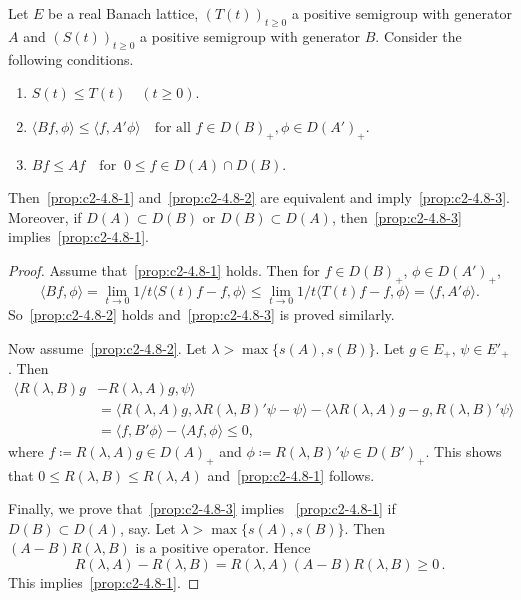 \begin{proposition}\label{prop:c2-4.8}
Let $E$ be a real Banach lattice, $(T(t))_{t \geq 0}$ a
positive semigroup with generator $A$ and $(S(t))_{t \geq 0}$ a positive
semigroup with generator $B$. Consider the following conditions.
\begin{enumerate}[\upshape (a)]
\item \label{prop:c2-4.8-1}
$S(t) \leq T(t) \quad (t \geq 0)$.
\item \label{prop:c2-4.8-2}
$\langle Bf,\phi\rangle \leq \langle f,A'\phi\rangle \quad \text{for all } f \in D(B)_{+}, \phi \in D(A')_{+}$.
\item \label{prop:c2-4.8-3}
$Bf \leq Af \quad \text{for }\ 0 \leq f \in D(A) \cap D(B)$.
\end{enumerate}
Then~\ref{prop:c2-4.8-1} and~\ref{prop:c2-4.8-2}  are equivalent and imply~\ref{prop:c2-4.8-3}.
Moreover, if\/ $D(A) \subset D(B)$ or $D(B) \subset D(A)$, then~\ref{prop:c2-4.8-3}   implies~\ref{prop:c2-4.8-1}.
\end{proposition}
\begin{proof}
Assume that~\ref{prop:c2-4.8-1}   holds. 
Then for $f \in D(B)_{+}$, $\phi \in D(A')_{+}$,
\begin{equation*}
\langle Bf,\phi\rangle = \lim_{t \to 0} 1/t \langle S(t)f - f, \phi\rangle \leq \lim_{t \to 0} 1/t \langle T(t)f - f, \phi\rangle 
= \langle f, A'\phi\rangle.
\end{equation*}
So~\ref{prop:c2-4.8-2}   holds and~\ref{prop:c2-4.8-3}   is proved similarly.

Now assume~\ref{prop:c2-4.8-2}. 
Let $\lambda > \max \{s(A), s(B)\}$. Let $g \in E_{+}$, $\psi \in E'_{+}$.
Then 
\begin{align*}
\langle R(\lambda,B)g &- R(\lambda,A)g, \psi\rangle\\
&= \langle R(\lambda,A)g, \lambda R(\lambda,B)'\psi - \psi\rangle - \langle \lambda R(\lambda,A)g - g, R(\lambda,B)'\psi\rangle\\
&= \langle f, B'\phi\rangle - \langle Af, \phi\rangle \leq 0,
\end{align*}
where $f \coloneq R(\lambda,A)g \in D(A)_{+}$ and $\phi \coloneq R(\lambda,B)'\psi \in D(B')_{+}$. 
This shows that $0 \leq R(\lambda,B) \leq R(\lambda,A)$ and~\ref{prop:c2-4.8-1}   follows.

Finally, we prove that~\ref{prop:c2-4.8-3}   implies ~\ref{prop:c2-4.8-1}   if\/ $D(B) \subset D(A)$, say.
Let $\lambda > \max\{s(A),s(B)\}$. 
Then $(A - B)R(\lambda,B)$ is a positive operator.
Hence 
\[
R(\lambda,A) - R(\lambda,B) = R(\lambda,A)(A - B)R(\lambda,B) \geq 0\,.
\]
This implies~\ref{prop:c2-4.8-1}.
\end{proof}
